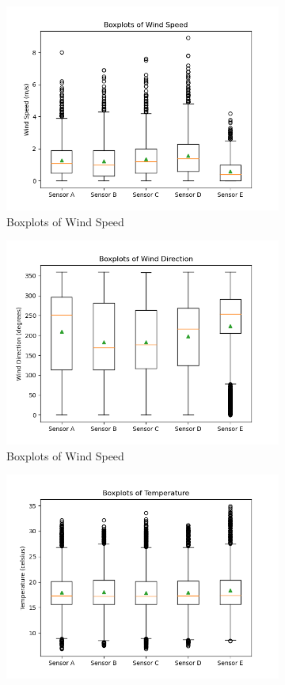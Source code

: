 \documentclass[a4paper,12pt]{article} %
\begin{document}
\begin{figure}[H] %
	\centering %
	\begin{subfigure}[b]{0.4\linewidth}
		\includegraphics[width=0.9\linewidth]{Figure_4.png} 
		\caption{Boxplots of Wind Speed}
	\end{subfigure}
	\begin{subfigure}[b]{0.4\linewidth}
		\includegraphics[width=0.9\linewidth]{Figure_5.png} 
		\caption{Boxplots of Wind Speed}
	\end{subfigure}
	\begin{subfigure}[b]{0.4\linewidth}
	\includegraphics[width=0.9\linewidth]{Figure_6.png} 

\end{subfigure}
\end{figure}
\end{document}
